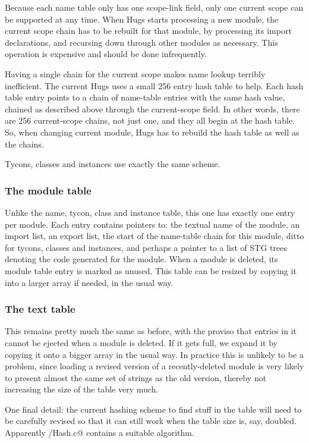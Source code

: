 Because each name table only has one scope-link field, only
one current scope can be supported at any time.  When Hugs
starts processing a new module, the current scope chain has to
be rebuilt for that module, by processing its import declarations,
and recursing down through other modules as necessary.  This operation
is expensive and should be done infrequently.

Having a single chain for the current scope makes
name lookup terribly inefficient.   The current Hugs uses a small
256 entry hash table to help.  Each hash table entry points to a
chain of name-table entries with the same hash value, chained as
described above through the current-scope field.  In other words,
there are 256 current-scope chains, not just one, and they all 
begin at the hash table.  So, when changing current module,
Hugs has to rebuild the hash table as well as the chains.

Tycons, classes and instances use exactly the same scheme.


\subsubsection*{The module table}

Unlike the name, tycon, class and instance table, this one 
has exactly one entry per module.  Each entry contains 
pointers to: the textual name of the module,
an import list, an export list,
the start of the name-table chain
for this module, ditto for tycons, classes and instances, 
and perhaps a pointer to a list of STG trees denoting the
code generated for the module.  When a module is deleted,
its module table entry is marked as unused.  This table can
be resized by copying it into a larger array if needed, in the
usual way.

\subsubsection*{The text table}

This remains pretty much the same as before, with the proviso
that entries in it cannot be ejected when a module is deleted.  
If it gets full, we expand it by copying it onto a bigger
array in the usual way.  In practice this is unlikely to be
a problem, since loading a revised version of a recently-deleted
module is very likely to present almost the same set of strings
as the old version, thereby not increasing the size of the
table very much.

One final detail: the current hashing scheme to find stuff in
the table will need to be carefully revised so that it can
still work when the table size is, say, doubled.  Apparently
\verb@rts/Hash.c@ contains a suitable algorithm.

